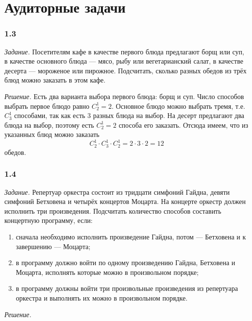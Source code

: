 \section*{Аудиторные задачи}

\subsubsection*{1.3}

\textit{Задание.} Посетителям кафе в качестве первого блюда предлагают борщ или суп, в качестве основного блюда --- мясо, рыбу или вегетарианский салат, в качестве десерта --- мороженое или пирожное.
Подсчитать, сколько разных обедов из трёх блюд можно заказать в этом кафе.

\textit{Решение.} Есть два варианта выбора первого блюда: борщ и суп.
Число способов выбрать первое блюдо равно $C_2^1=2$.
Основное блюдо можно выбрать тремя, т.е. $C_3^1$ способами, так как есть 3 разных блюда на выбор.
На десерт предлагают два блюда на выбор, поэтому есть $C_2^1=2$ способа его заказать.
Отсюда имеем, что из указанных блюд можно заказать
$$ C_2^1 \cdot C_3^1 \cdot C_2^1 = 2 \cdot 3 \cdot 2 = 12 $$ обедов.

\subsubsection*{1.4}

\textit{Задание.} Репертуар оркестра состоит из тридцати симфоний Гайдна, девяти симфоний Бетховена и четырёх концертов Моцарта.
На концерте оркестр должен исполнить три произведения.
Подсчитать количество способов составить концертную программу, если:
\begin{enumerate}[label=\alph*)]
\item сначала необходимо исполнить произведение Гайдна, потом --- Бетховена и к завершению --- Моцарта;
\item в программу должно войти по одному произведению Гайдна, Бетховена и Моцарта, исполнять которые можно в произвольном порядке;
\item в программу должны войти три произвольные произведения из репертуара оркестра и выполнять их можно в произвольном порядке.
\end{enumerate}

\textit{Решение.} 

